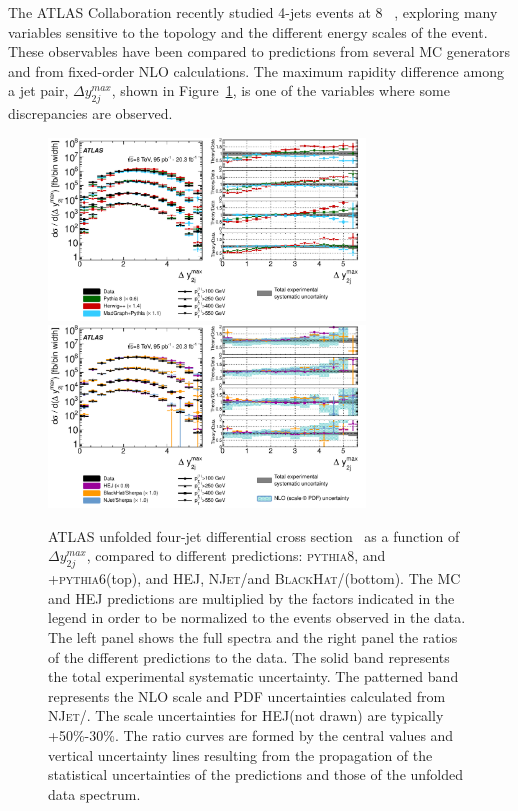\documentclass{PoS}
\providecommand{\NJET} {{\textsc{NJet}}\xspace}
\providecommand{\BLACKHAT} {{\textsc{BlackHat}}\xspace}
\providecommand{\HEJ} {{\textsc{HEJ}}\xspace}
\providecommand{\PYTHIAS} {{\textsc{pythia6}}\xspace}
\providecommand{\PYTHIAE} {{\textsc{pythia8}}\xspace}
\begin{document}
The ATLAS Collaboration recently studied 4-jets events at 8 \TeV~\cite{Aad:2015nda}, exploring many variables sensitive to the topology and the
different energy scales of the event. These observables have been compared to predictions from several MC
generators and from fixed-order NLO calculations. The maximum rapidity difference among a jet pair, $\Delta
y_{2j}^{max}$, shown in Figure~\ref{fig:4jet}, is one of the variables where some discrepancies are observed.
\begin{figure}[htbp]
  \centering
  \includegraphics[width=0.75\textwidth]{Figure6a.pdf}\\
  \includegraphics[width=0.75\textwidth]{Figure6b.pdf}
  \caption{ATLAS unfolded four-jet differential cross section~\cite{Aad:2015nda} as a function of $\Delta y_{2j}^{max}$, compared to different
    predictions: \PYTHIAE, \HERWIGpp and \MADGRAPH+\PYTHIAS (top), and HEJ, \NJET/\SHERPA and \BLACKHAT/\SHERPA (bottom). The MC
    and \HEJ predictions are multiplied by the factors indicated in the legend in order to be normalized to the events observed in the data. The left 
    panel shows the full spectra and the right panel the ratios of the different predictions to the data. The solid band represents the total experimental systematic
    uncertainty. The patterned band represents the NLO scale and PDF uncertainties calculated from
     \NJET/\SHERPA. The scale uncertainties for \HEJ (not drawn) are typically
    +50\%-30\%. The ratio curves are formed by the central values and vertical uncertainty lines resulting from the
    propagation of the statistical uncertainties of the predictions and those of the unfolded data spectrum.} 
  \label{fig:4jet}
\end{figure} 
\end{document}
